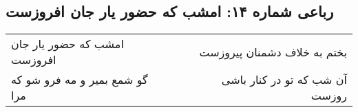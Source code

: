 \begin{center}
\section*{رباعی شماره ۱۴: امشب که حضور یار جان افروزست}
\label{sec:014}
\begin{longtable}{l p{0.5cm} r}
امشب که حضور یار جان افروزست
&&
بختم به خلاف دشمنان پیروزست
\\
گو شمع بمیر و مه فرو شو که مرا
&&
آن شب که تو در کنار باشی روزست
\\
\end{longtable}
\end{center}

